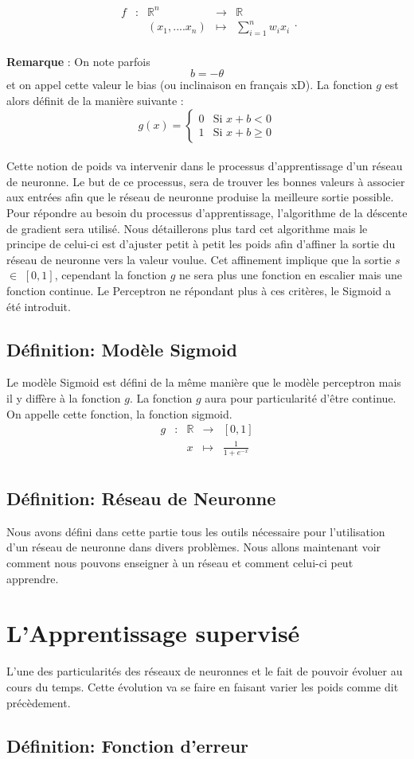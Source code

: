 \documentclass{article}
\newcommand{\fonction}[5]{
	\begin{array}{ccccc}
#1 & : & #2 & \to & #3\\
	& & #4 & \mapsto & #5\\ 
	\end{array}
}
\begin{document}
		\[\fonction{f}{\mathbb{R}^n}{\mathbb{R}}{(x_1,....x_n)}{\sum_{i=1}^{n} {w_ix_i}}. \]

	
	\textbf{Remarque} : On note parfois \[b = -\theta \]  et on appel cette valeur le bias (ou inclinaison en français xD). La fonction $g$ est alors définit de la manière suivante :   
		\[g(x) = \begin{cases} 0 &\mbox{Si } x + b < 0 \\
				 1 & \mbox{Si } x + b \geq 0
	 		 \end{cases} \] \\ 

	 
Cette notion de poids va intervenir dans le processus d'apprentissage d'un réseau de neuronne. Le but de ce processus, sera de trouver les bonnes valeurs à associer aux entrées afin que le réseau de neuronne produise la meilleure sortie possible. Pour répondre au besoin du processus d'apprentissage, l'algorithme de la déscente de gradient sera utilisé. Nous détaillerons plus tard cet algorithme mais le principe de celui-ci est d'ajuster petit à petit les poids afin d'affiner la sortie du réseau de neuronne vers la valeur voulue. Cet affinement implique que la sortie $s$ $\in$ $\left[0,1\right]$, cependant la fonction $g$ ne sera  plus une fonction en escalier mais une fonction continue. Le Perceptron ne répondant plus à ces critères, le Sigmoid a été introduit. \\

	\subsection{Définition: Modèle Sigmoid}
	 Le modèle Sigmoid est défini de la même manière que le modèle perceptron mais il y diffère à la fonction $g$. La fonction $g$ aura pour particularité d'être continue. On appelle cette fonction, la fonction sigmoid.  
		  \[ \fonction{g}{\mathbb{R}}{\left[0,1\right]}{x}{ \frac{1}{1+ e^{-x}}} \]
		
	\subsection{Définition: Réseau de Neuronne}
	
	Nous avons défini dans cette partie tous les outils nécessaire pour l'utilisation d'un réseau de neuronne dans divers problèmes. Nous allons maintenant voir comment nous pouvons enseigner à un réseau et comment celui-ci peut apprendre. 	
	
\section{L'Apprentissage supervisé}
	
	L'une des particularités des réseaux de neuronnes et le fait de pouvoir évoluer au cours du temps. Cette évolution va se faire en faisant varier les poids comme dit précèdement. 
 
	\subsection{Définition: Fonction d'erreur}


 
\end{document}

